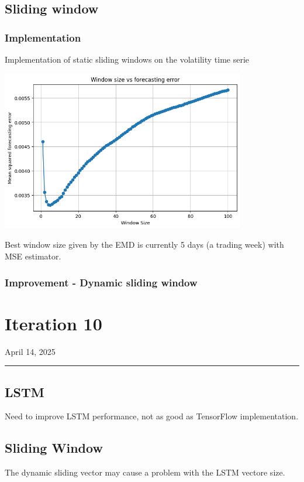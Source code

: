 \documentclass[letterpaper,11pt]{article}
\begin{document}
\subsection*{Sliding window}
\subsubsection*{Implementation}
Implementation of static sliding windows on the volatility time serie 
  \begin{center}
  \includegraphics[width=0.8\textwidth]{img/win_err.png}
  \end{center} %
  Best window size given by the EMD is currently 5 days (a trading week) with MSE estimator.


\subsubsection*{Improvement - Dynamic sliding window}




\newpage
\section*{Iteration 10}
\begin{flushright}
April 14, 2025
\end{flushright}
\hrule
\vspace{0.2in}

\subsection*{LSTM}

Need to improve LSTM performance, not as good as TensorFlow implementation.

\subsection*{Sliding Window}
The dynamic sliding vector may cause a problem with the LSTM vectore size.
\end{document}
